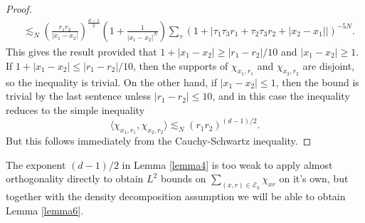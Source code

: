 \begin{proof}
\begin{align*}
        &\lesssim_N \left( \frac{r_1r_2}{|x_1 - x_2|} \right)^{\frac{d-1}{2}} \left(1 + \frac{1}{|x_1 - x_2|^N} \right) \sum_\tau \left( 1 + |\tau_1 \tau_3 r_1 + \tau_2 \tau_3 r_2 + |x_2 - x_1|| \right)^{-5N}.
    \end{align*}
    This gives the result provided that $1 + |x_1 - x_2| \geq |r_1 - r_2| / 10$ and $|x_1 - x_2| \geq 1$. If $1 + |x_1 - x_2| \leq |r_1 - r_2| / 10$, then the supports of $\chi_{x_1,r_1}$ and $\chi_{x_2,r_2}$ are disjoint, so the inequality is trivial. On the other hand, if $|x_1 - x_2| \leq 1$, then the bound is trivial by the last sentence unless $|r_1 - r_2| \leq 10$, and in this case the inequality reduces to the simple inequality
    \[ \langle \chi_{x_1,r_1}, \chi_{x_2,r_2} \rangle \lesssim_N (r_1 r_2)^{(d-1)/2}. \] 
    But this follows immediately from the Cauchy-Schwartz inequality.
\end{proof}

The exponent $(d-1)/2$ in Lemma \ref{lemma4} is too weak to apply almost orthogonality directly to obtain $L^2$ bounds on $\sum_{(x,r) \in \mathcal{E}_k} \chi_{xr}$ on it's own, but together with the density decomposition assumption we will be able to obtain Lemma \ref{lemma6}.

